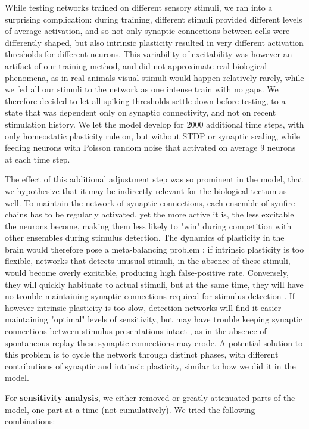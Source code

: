 \documentclass{article}
\begin{document}
While testing networks trained on different sensory stimuli, we ran into a surprising complication: during training, different stimuli provided different levels of average activation, and so not only synaptic connections between cells were differently shaped, but also intrinsic plasticity resulted in very different activation thresholds for different neurons. This variability of excitability was however an artifact of our training method, and did not approximate real biological phenomena, as in real animals visual stimuli would happen relatively rarely, while we fed all our stimuli to the network as one intense train with no gaps. We therefore decided to let all spiking thresholds settle down before testing, to a state that was dependent only on synaptic connectivity, and not on recent stimulation history. We let the model develop for 2000 additional time steps, with only homeostatic plasticity rule on, but without STDP or synaptic scaling, while feeding neurons with Poisson random noise that activated on average 9 neurons at each time step. 

The effect of this additional adjustment step was so prominent in the model, that we hypothesize that it may be indirectly relevant for the biological tectum as well. To maintain the network of synaptic connections, each ensemble of synfire chains has to be regularly activated, yet the more active it is, the less excitable the neurons become, making them less likely to "win" during competition with other ensembles during stimulus detection. The dynamics of plasticity in the brain would therefore pose a meta-balancing problem \citep{zenke2017temporal}: if intrinsic plasticity is too flexible, networks that detects unusual stimuli, in the absence of these stimuli, would become overly excitable, producing high false-positive rate. Conversely, they will quickly habituate to actual stimuli, but at the same time, they will have no trouble maintaining synaptic connections required for stimulus detection \citep{litwin2014assemblies}. If however intrinsic plasticity is too slow, detection networks will find it easier maintaining "optimal" levels of sensitivity, but may have trouble keeping synaptic connections between stimulus presentations intact \citep{triplett2018emergence}, as in the absence of spontaneous replay these synaptic connections may erode. A potential solution to this problem is to cycle the network through distinct phases, with different contributions of synaptic and intrinsic plasticity, similar to how we did it in the model.

For \textbf{sensitivity analysis}, we either removed or greatly attenuated parts of the model, one part at a time (not cumulatively). We tried the following combinations:
\end{document}
